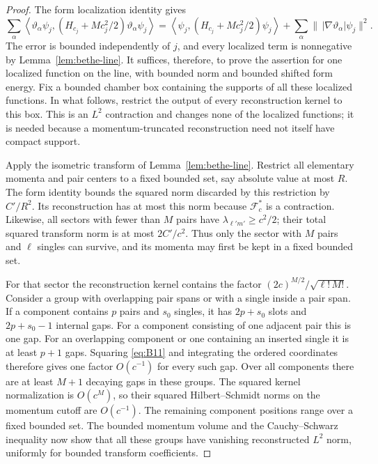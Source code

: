 \begin{proof}
The form localization identity gives
\[
 \sum_\alpha
 \left\langle\vartheta_\alpha\psi_j,
      (H_{c_j}+Mc_j^2/2)\vartheta_\alpha\psi_j\right\rangle
 =
 \left\langle\psi_j,
      (H_{c_j}+Mc_j^2/2)\psi_j\right\rangle
 +\sum_\alpha\|\,|\nabla\vartheta_\alpha|\psi_j\|^2.
\]
The error is bounded independently of \(j\), and every localized
term is nonnegative by Lemma~\ref{lem:bethe-line}.
It suffices, therefore, to prove the assertion for one localized
function on the line, with bounded norm and bounded shifted form
energy.  Fix a bounded chamber box containing the supports of
all these localized functions.  In what follows, restrict the
output of every reconstruction kernel to this box.  This is an
\(L^2\) contraction and changes none of the localized functions;
it is needed because a momentum-truncated reconstruction need
not itself have compact support.

Apply the isometric transform of Lemma~\ref{lem:bethe-line}.
Restrict all elementary momenta and pair centers to a fixed
bounded set, say absolute value at most \(R\).
The form identity bounds the squared norm discarded by this
restriction by \(C'/R^2\).  Its reconstruction has at most this
norm because \(\mathcal F_c^*\) is a contraction.
Likewise, all sectors with fewer than \(M\) pairs have
\(\lambda_{\ell'm'}\geq c^2/2\); their total squared transform
norm is at most \(2C'/c^2\).  Thus only the sector with \(M\)
pairs and \(\ell\) singles can survive, and its momenta may first
be kept in a fixed bounded set.

For that sector the reconstruction kernel contains the factor
\((2c)^{M/2}/\sqrt{\ell!\,M!}\).  Consider a group with overlapping
pair spans or with a single inside a pair span.
If a component contains \(p\) pairs and \(s_0\) singles, it has
\(2p+s_0\) slots and \(2p+s_0-1\) internal gaps.
For a component consisting of one adjacent pair this is one gap.
For an overlapping component or one containing an inserted
single it is at least \(p+1\) gaps.
Squaring \eqref{eq:B11} and integrating the ordered coordinates
therefore gives one factor \(O(c^{-1})\) for every such gap.
Over all components there are at least \(M+1\) decaying gaps in
these groups.  The squared kernel normalization is \(O(c^M)\),
so their squared Hilbert--Schmidt norms on the momentum cutoff
are \(O(c^{-1})\).  The remaining component positions range over
a fixed bounded set.  The bounded momentum volume and the
Cauchy--Schwarz inequality now show that all these groups have
vanishing reconstructed \(L^2\) norm, uniformly for bounded
transform coefficients.


\end{proof}
